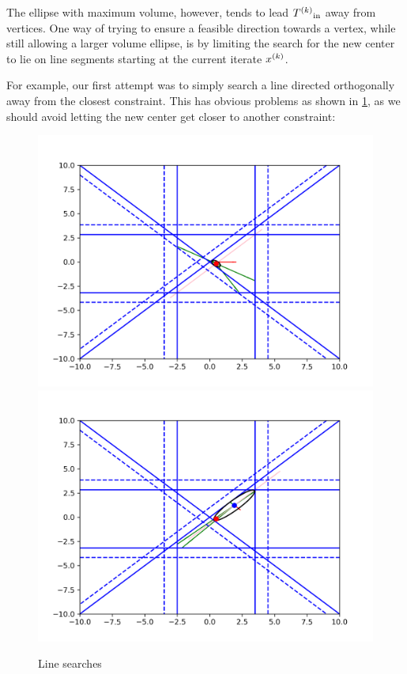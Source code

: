The ellipse with maximum volume, however, tends to lead ${T^{(k)}}_{\text{in}}$ away from vertices.
One way of trying to ensure a feasible direction towards a vertex, while still allowing a larger volume ellipse, is by limiting the search for the new center to lie on line segments starting at the current iterate ${x}^{(k)}$.

For example, our first attempt was to simply search a line directed orthogonally away from the closest constraint.
This has obvious problems as shown in \cref{first_line_search}, as we should avoid letting the new center get closer to another constraint:

\begin{figure}[h]
    \centering
    \includegraphics[scale=0.4]{images/line_1.png}
    \includegraphics[scale=0.4]{images/line_2.png}
    \caption{Line searches}
    \label{first_line_search}
\end{figure}


